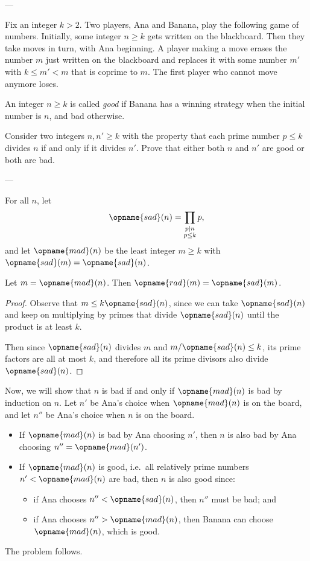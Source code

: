 
---

Fix an integer $k>2$. Two players, Ana and Banana, play the following game of numbers. Initially, some integer $n\ge k$ gets written on the blackboard. Then they take moves in turn, with Ana beginning. A player making a move erases the number $m$ just written on the blackboard and replaces it with some number $m'$ with $k\le m'<m$ that is coprime to $m$. The first player who cannot move anymore loses.

An integer $n\ge k$ is called \emph{good} if Banana has a winning strategy when the initial number is $n$, and bad otherwise.

Consider two integers $n,n'\ge k$ with the property that each prime number $p\le k$ divides $n$ if and only if it divides $n'$. Prove that either both $n$ and $n'$ are good or both are bad.

---

For all $n$, let
\[\opname{sad}(n)=\prod_{\substack{p\mid n\\ p\le k}}p,\]
and let $\opname{mad}(n)$ be the least integer $m\ge k$ with $\opname{sad}(m)=\opname{sad}(n)$.
\begin{claim*}
    Let $m=\opname{mad}(n)$. Then $\opname{rad}(m)=\opname{sad}(m)$.
\end{claim*}
\begin{proof}
    Observe that $m\le k\opname{sad}(n)$, since we can take $\opname{sad}(n)$ and keep on multiplying by primes that divide $\opname{sad}(n)$ until the product is at least $k$.

    Then since $\opname{sad}(n)$ divides $m$ and $m/\opname{sad}(n)\le k$, its prime factors are all at most $k$, and therefore all its prime divisors also divide $\opname{sad}(n)$.
\end{proof}

Now, we will show that $n$ is bad if and only if $\opname{mad}(n)$ is bad by induction on $n$. Let $n'$ be Ana's choice when $\opname{mad}(n)$ is on the board, and let $n''$ be Ana's choice when $n$ is on the board.
\begin{itemize}[itemsep=0em]
    \item If $\opname{mad}(n)$ is bad by Ana choosing $n'$, then $n$ is also bad by Ana choosing $n''=\opname{mad}(n')$.
    \item If $\opname{mad}(n)$ is good, i.e.\ all relatively prime numbers $n'<\opname{mad}(n)$ are bad, then $n$ is also good since:
        \begin{itemize}
            \item if Ana chooses $n''<\opname{sad}(n)$, then $n''$ must be bad; and
            \item if Ana chooses $n''>\opname{mad}(n)$, then Banana can choose $\opname{mad}(n)$, which is good.
        \end{itemize}
\end{itemize}
The problem follows.
